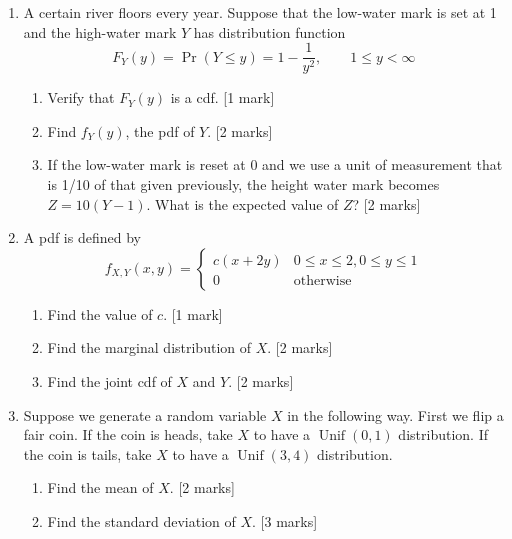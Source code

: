 \documentclass[
]{book}
\providecommand{\tightlist}{%
  \setlength{\itemsep}{0pt}\setlength{\parskip}{0pt}}
\DeclareMathOperator{\Unif}{Unif}
\theoremstyle{definition}
\theoremstyle{definition}
\theoremstyle{definition}
\theoremstyle{definition}
\theoremstyle{remark}
\begin{document}
\begin{enumerate}
\def\labelenumi{\arabic{enumi}.}
\item
  A certain river floors every year. Suppose that the low-water mark is set at 1 and the high-water mark \(Y\) has distribution function
  \[
  F_Y(y) = \Pr(Y\leq y) = 1 - \frac{1}{y^2}, \hspace{2em} 1\leq y<\infty
  \]

  \begin{enumerate}
  \def\labelenumii{(\alph{enumii})}
  \tightlist
  \item
    Verify that \(F_Y(y)\) is a cdf. {[}1 mark{]}
  \item
    Find \(f_Y(y)\), the pdf of \(Y\). {[}2 marks{]}
  \item
    If the low-water mark is reset at 0 and we use a unit of measurement that is 1/10 of that given previously, the height water mark becomes \(Z=10(Y-1)\). What is the expected value of \(Z\)? {[}2 marks{]}
  \end{enumerate}
\item
  A pdf is defined by
  \[
  f_{X,Y}(x,y) = \begin{cases}
   c(x+2y) &0\leq x \leq 2, 0\leq y \leq 1 \\
   0&\text{otherwise}
  \end{cases}
  \]

  \begin{enumerate}
  \def\labelenumii{(\alph{enumii})}
  \tightlist
  \item
    Find the value of \(c\). {[}1 mark{]}
  \item
    Find the marginal distribution of \(X\). {[}2 marks{]}
  \item
    Find the joint cdf of \(X\) and \(Y\). {[}2 marks{]}
  \end{enumerate}
\item
  Suppose we generate a random variable \(X\) in the following way. First we flip a fair coin. If the coin is heads, take \(X\) to have a \(\Unif(0,1)\) distribution. If the coin is tails, take \(X\) to have a \(\Unif(3,4)\) distribution.

  \begin{enumerate}
  \def\labelenumii{(\alph{enumii})}
  \tightlist
  \item
    Find the mean of \(X\). {[}2 marks{]}
  \item
    Find the standard deviation of \(X\). {[}3 marks{]}
  \end{enumerate}
\end{enumerate}
\end{document}
